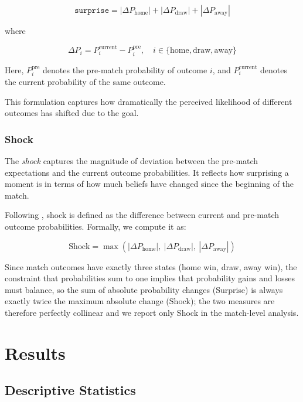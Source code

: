 \documentclass[11pt]{article}
\begin{document}
\[
\texttt{surprise} = |\Delta P_{\text{home}}| + |\Delta P_{\text{draw}}| + |\Delta P_{\text{away}}|
\]

where

\[
\Delta P_i = P_i^{\text{current}} - P_i^{\text{pre}}, \quad i \in \{\text{home}, \text{draw}, \text{away} \}
\]

Here, \( P_i^{\text{pre}} \) denotes the pre-match probability of outcome \( i \), and \( P_i^{\text{current}} \) denotes the current probability of the same outcome.

\vspace{0.5em}
This formulation captures how dramatically the perceived likelihood of different outcomes has shifted due to the goal.



\subsubsection*{Shock}

The \textit{shock} captures the magnitude of deviation between the pre-match expectations and the current outcome probabilities. It reflects how surprising a moment is in terms of how much beliefs have changed since the beginning of the match.

Following \citet{buraimo2020unscripted}, shock is defined as the difference between current and pre-match outcome probabilities. Formally, we compute it as:

\[
\text{Shock} = \max \left( \left| \Delta P_{\text{home}} \right|,\ \left| \Delta P_{\text{draw}} \right|,\ \left| \Delta P_{\text{away}} \right| \right)
\]

Since match outcomes have exactly three states (home win, draw, away win), the constraint that probabilities sum to one implies that probability gains and losses must balance, so the sum of absolute probability changes (Surprise) is always exactly twice the maximum absolute change (Shock); the two measures are therefore perfectly collinear and we report only Shock in the match-level analysis.



\section{Results}
\label{sec:results}

\subsection{Descriptive Statistics}


\end{document}
